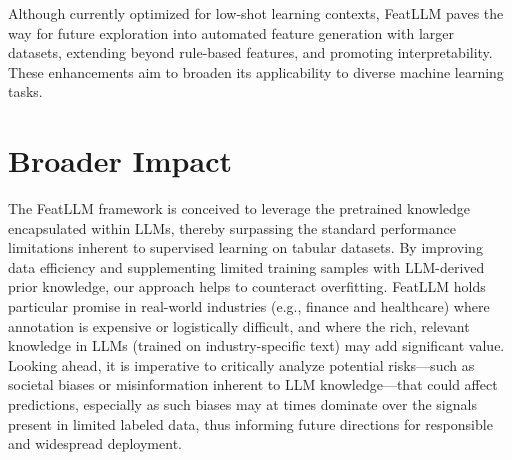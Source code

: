 Although currently optimized for low-shot learning contexts, \textsf{FeatLLM} paves the way for future exploration into automated feature generation with larger datasets, extending beyond rule-based features, and promoting interpretability. These enhancements aim to broaden its applicability to diverse machine learning tasks.

\section{Broader Impact} The \textsf{FeatLLM} framework is conceived to leverage the pretrained knowledge encapsulated within LLMs, thereby surpassing the standard performance limitations inherent to supervised learning on tabular datasets. By improving data efficiency and supplementing limited training samples with LLM-derived prior knowledge, our approach helps to counteract overfitting. \textsf{FeatLLM} holds particular promise in real-world industries (e.g., finance and healthcare) where annotation is expensive or logistically difficult, and where the rich, relevant knowledge in LLMs (trained on industry-specific text) may add significant value. Looking ahead, it is imperative to critically analyze potential risks—such as societal biases or misinformation inherent to LLM knowledge—that could affect predictions, especially as such biases may at times dominate over the signals present in limited labeled data, thus informing future directions for responsible and widespread deployment.

